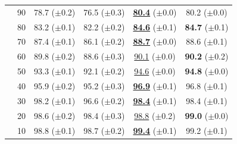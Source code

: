 \begin{table}[h!]
{\begin{tabular}{cccccc}
& 90  & 78.7 ($\pm$0.2) & 76.5 ($\pm$0.3) & \underline{\textbf{80.4}} ($\pm$0.0) & 80.2 ($\pm$0.0) \\
& 80  & 83.2 ($\pm$0.1) & 82.2 ($\pm$0.2) & \underline{\textbf{84.6}} ($\pm$0.1) & \textbf{84.7} ($\pm$0.1) \\
& 70  & 87.4 ($\pm$0.1) & 86.1 ($\pm$0.2) & \underline{\textbf{88.7}} ($\pm$0.0) & 88.6 ($\pm$0.1) \\
& 60  & 89.8 ($\pm$0.2) & 88.6 ($\pm$0.3) & \underline{90.1} ($\pm$0.0) & \textbf{90.2} ($\pm$0.2) \\
& 50  & 93.3 ($\pm$0.1) & 92.1 ($\pm$0.2) & \underline{94.6} ($\pm$0.0) & \textbf{94.8} ($\pm$0.0) \\
& 40  & 95.9 ($\pm$0.2) & 95.2 ($\pm$0.3) & \underline{\textbf{96.9}} ($\pm$0.1) & 96.8 ($\pm$0.1) \\
& 30  & 98.2 ($\pm$0.1) & 96.6 ($\pm$0.2) & \underline{\textbf{98.4}} ($\pm$0.1) & 98.4 ($\pm$0.1) \\
& 20  & 98.6 ($\pm$0.2) & 98.4 ($\pm$0.3) & \underline{98.8} ($\pm$0.2) & \textbf{99.0} ($\pm$0.0) \\
& 10  & 98.8 ($\pm$0.1) & 98.7 ($\pm$0.2) & \underline{\textbf{99.4}} ($\pm$0.1) & 99.2 ($\pm$0.1) \\
\bottomrule
\end{tabular}
}
\end{table}

